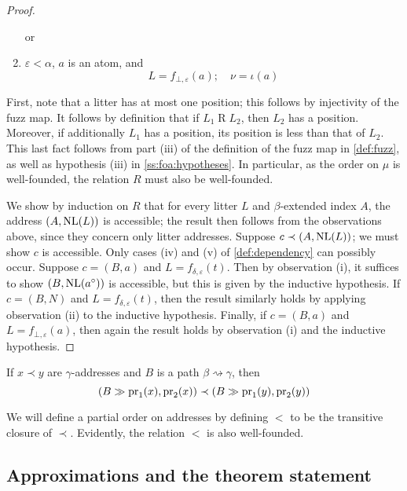 \begin{proof}
\begin{enumerate}
        or
        \item \( \varepsilon < \alpha \), \( a \) is an atom, and
        \[ L = f_{\bot,\varepsilon}(a); \quad \nu = \iota(a) \]
    \end{enumerate}
    First, note that a litter has at most one position; this follows by injectivity of the fuzz map.
    It follows by definition that if \( L_1 \mathrel{R} L_2 \), then \( L_2 \) has a position.
    Moreover, if additionally \( L_1 \) has a position, its position is less than that of \( L_2 \).
    This last fact follows from part (iii) of the definition of the fuzz map in \cref{def:fuzz}, as well as hypothesis (iii) in \cref{ss:foa:hypotheses}.
    In particular, as the order on \( \mu \) is well-founded, the relation \( R \) must also be well-founded.

    We show by induction on \( R \) that for every litter \( L \) and \( \beta \)-extended index \( A \), the address \( (A, \operatorname{NL}(L)) \) is accessible; the result then follows from the observations above, since they concern only litter addresses.
    Suppose \( c \prec (A, \operatorname{NL}(L)) \); we must show \( c \) is accessible.
    Only cases (iv) and (v) of \cref{def:dependency} can possibly occur.
    Suppose \( c = (B, a) \) and \( L = f_{\delta,\varepsilon}(t) \).
    Then by observation (i), it suffices to show \( (B, \operatorname{NL}(a^\circ)) \) is accessible, but this is given by the inductive hypothesis.
    If \( c = (B, N) \) and \( L = f_{\delta,\varepsilon}(t) \), then the result similarly holds by applying observation (ii) to the inductive hypothesis.
    Finally, if \( c = (B, a) \) and \( L = f_{\bot,\varepsilon}(a) \), then again the result holds by observation (i) and the inductive hypothesis.
\end{proof}

\begin{remark}
    If \( x \prec y \) are \( \gamma \)-addresses and \( B \) is a path \( \beta \rightsquigarrow \gamma \), then
    \[ (B \gg \operatorname{pr}_1(x), \operatorname{pr}_2(x)) \prec (B \gg \operatorname{pr}_1(y), \operatorname{pr}_2(y)) \]
\end{remark}

We will define a partial order on addresses by defining \( < \) to be the transitive closure of \( \prec \).
Evidently, the relation \( < \) is also well-founded.

\subsection{Approximations and the theorem statement}

